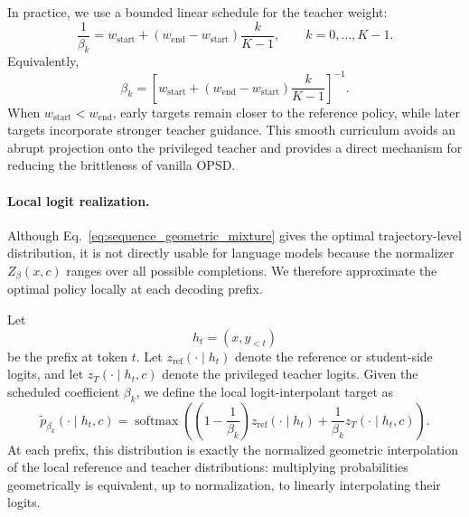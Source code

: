 In practice, we use a bounded linear schedule for the teacher weight:
\begin{equation}
    \frac{1}{\beta_k}
    =
    w_{\mathrm{start}}
    +
    \left(
    w_{\mathrm{end}}-w_{\mathrm{start}}
    \right)
    \frac{k}{K-1},
    \qquad
    k=0,\ldots,K-1.
    \label{eq:bounded_beta_schedule}
\end{equation}
Equivalently,
\begin{equation}
    \beta_k
    =
    \left[
    w_{\mathrm{start}}
    +
    \left(
    w_{\mathrm{end}}-w_{\mathrm{start}}
    \right)
    \frac{k}{K-1}
    \right]^{-1}.
\end{equation}
When $w_{\mathrm{start}}<w_{\mathrm{end}}$, early targets remain closer to the
reference policy, while later targets incorporate stronger teacher guidance. This smooth
curriculum avoids an abrupt projection onto the privileged teacher and provides a direct
mechanism for reducing the brittleness of vanilla OPSD.

\paragraph{Local logit realization.}
Although Eq.~\ref{eq:sequence_geometric_mixture} gives the optimal trajectory-level
distribution, it is not directly usable for language models because the normalizer
$Z_{\beta}(x,c)$ ranges over all possible completions. We therefore approximate the
optimal policy locally at each decoding prefix.

Let
\begin{equation}
    h_t=(x,y_{<t})
\end{equation}
be the prefix at token $t$. Let $z_{\mathrm{ref}}(\cdot\mid h_t)$ denote the reference
or student-side logits, and let $z_T(\cdot\mid h_t,c)$ denote the privileged teacher logits.
Given the scheduled coefficient $\beta_k$, we define the local logit-interpolant target as
\begin{equation}
    \tilde p_{\beta_k}(\cdot\mid h_t,c)
    =
    \operatorname{softmax}
    \left(
    \left(1-\frac{1}{\beta_k}\right)
    z_{\mathrm{ref}}(\cdot\mid h_t)
    +
    \frac{1}{\beta_k}
    z_T(\cdot\mid h_t,c)
    \right).
    \label{eq:local_logit_interpolant}
\end{equation}
At each prefix, this distribution is exactly the normalized geometric interpolation of the
local reference and teacher distributions: multiplying probabilities geometrically is
equivalent, up to normalization, to linearly interpolating their logits.

